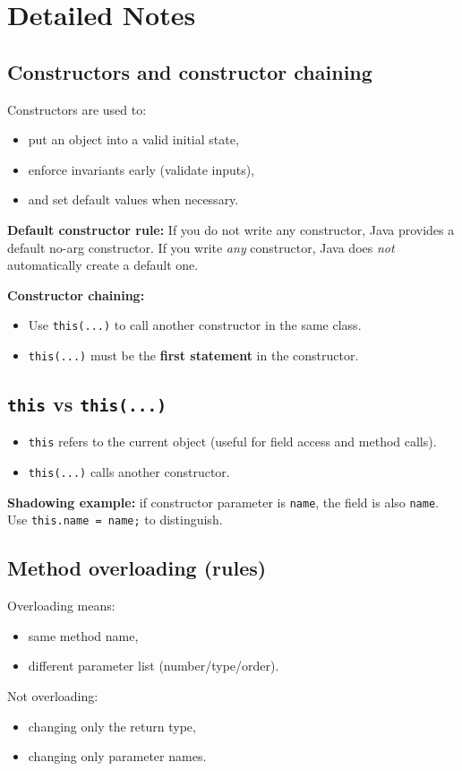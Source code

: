\documentclass[11pt]{article}
\begin{document}
\section{Detailed Notes}
\subsection{Constructors and constructor chaining}
Constructors are used to:
\begin{itemize}
  \item put an object into a valid initial state,
  \item enforce invariants early (validate inputs),
  \item and set default values when necessary.
\end{itemize}

\textbf{Default constructor rule:} If you do not write any constructor, Java provides a default no-arg constructor.
If you write \emph{any} constructor, Java does \emph{not} automatically create a default one.

\textbf{Constructor chaining:}
\begin{itemize}
  \item Use \texttt{this(...)} to call another constructor in the same class.
  \item \texttt{this(...)} must be the \textbf{first statement} in the constructor.
\end{itemize}

\subsection{\texttt{this} vs \texttt{this(...)}}
\begin{itemize}
  \item \texttt{this} refers to the current object (useful for field access and method calls).
  \item \texttt{this(...)} calls another constructor.
\end{itemize}

\textbf{Shadowing example:} if constructor parameter is \texttt{name}, the field is also \texttt{name}.
Use \texttt{this.name = name;} to distinguish.

\subsection{Method overloading (rules)}
Overloading means:
\begin{itemize}
  \item same method name,
  \item different parameter list (number/type/order).
\end{itemize}
Not overloading:
\begin{itemize}
  \item changing only the return type,
  \item changing only parameter names.
\end{itemize}
\end{document}
